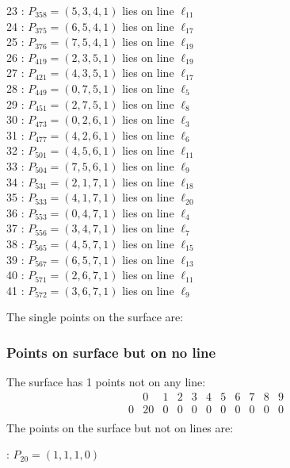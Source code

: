 \documentclass{article}
\begin{document}
{\begin{multicols}{2}
23 : $P_{358}=( 5, 3, 4, 1 )$ lies on line $\ell_{11}$\\
24 : $P_{375}=( 6, 5, 4, 1 )$ lies on line $\ell_{17}$\\
25 : $P_{376}=( 7, 5, 4, 1 )$ lies on line $\ell_{19}$\\
26 : $P_{419}=( 2, 3, 5, 1 )$ lies on line $\ell_{19}$\\
27 : $P_{421}=( 4, 3, 5, 1 )$ lies on line $\ell_{17}$\\
28 : $P_{449}=( 0, 7, 5, 1 )$ lies on line $\ell_{5}$\\
29 : $P_{451}=( 2, 7, 5, 1 )$ lies on line $\ell_{8}$\\
30 : $P_{473}=( 0, 2, 6, 1 )$ lies on line $\ell_{3}$\\
31 : $P_{477}=( 4, 2, 6, 1 )$ lies on line $\ell_{6}$\\
32 : $P_{501}=( 4, 5, 6, 1 )$ lies on line $\ell_{11}$\\
33 : $P_{504}=( 7, 5, 6, 1 )$ lies on line $\ell_{9}$\\
34 : $P_{531}=( 2, 1, 7, 1 )$ lies on line $\ell_{18}$\\
35 : $P_{533}=( 4, 1, 7, 1 )$ lies on line $\ell_{20}$\\
36 : $P_{553}=( 0, 4, 7, 1 )$ lies on line $\ell_{4}$\\
37 : $P_{556}=( 3, 4, 7, 1 )$ lies on line $\ell_{7}$\\
38 : $P_{565}=( 4, 5, 7, 1 )$ lies on line $\ell_{15}$\\
39 : $P_{567}=( 6, 5, 7, 1 )$ lies on line $\ell_{13}$\\
40 : $P_{571}=( 2, 6, 7, 1 )$ lies on line $\ell_{11}$\\
41 : $P_{572}=( 3, 6, 7, 1 )$ lies on line $\ell_{9}$\\
\end{multicols}
The single points on the surface are:\\
\subsubsection*{Points on surface but on no line}
The surface has 1 points not on any line:\\
$$
\begin{array}{r|*{10}{r}}
 & 0 & 1 & 2 & 3 & 4 & 5 & 6 & 7 & 8 & 9\\
\hline
0 & 20 & 0 & 0 & 0 & 0 & 0 & 0 & 0 & 0 & 0\\
\end{array}
$$
The points on the surface but not on lines are:\\
\begin{multicols}{2}
 : $P_{20}=( 1, 1, 1, 0 )$\\
\end{multicols}
}
\end{document}
